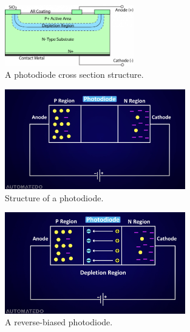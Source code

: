 \documentclass{loyola-beamer}
\begin{document}
\begin{frame}
	\begin{figure}
		\begin{center}
			\includegraphics[width=0.5\textwidth]{./figures/photodiode-cross.png}
		\end{center}
		\caption{A photodiode cross section structure.}
	\end{figure}
\end{frame}

\begin{frame}
	\begin{figure}
		\begin{center}
			\includegraphics[width=0.7\textwidth]{./figures/photodiode-off.png}
		\end{center}
		\caption{Structure of a photodiode.}
	\end{figure}
\end{frame}

\begin{frame}
	\begin{figure}
		\begin{center}
			\includegraphics[width=0.7\textwidth]{./figures/reverse-biased.png}
		\end{center}
		\caption{A reverse-biased photodiode.}
	\end{figure}
\end{frame}
\end{document}
